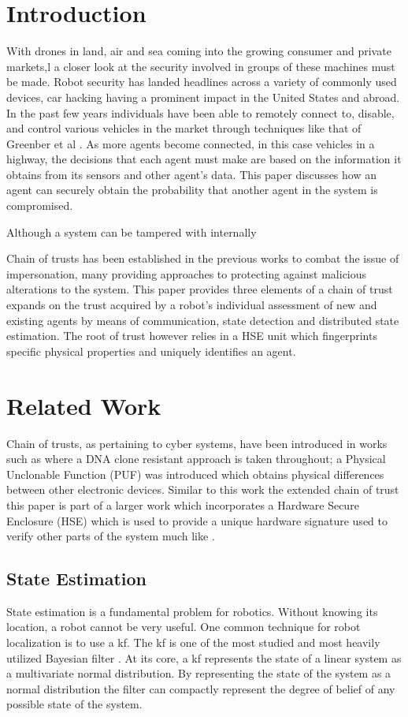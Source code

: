 \documentclass[conference]{IEEEtran}
\begin{document}
\section{Introduction}
With drones in land, air and sea coming into the growing consumer and private markets,l a closer look at the security involved in groups of these machines must be made. Robot security has landed headlines across a variety of commonly used devices, car hacking having a prominent impact in the United States and abroad. In the past few years individuals have been able to remotely connect to, disable, and control various vehicles in the market through techniques like that of Greenber et al \cite{greenberg2015hackers}. As more agents become connected, in this case vehicles in a highway, the decisions that each agent must make are based on the information it obtains from its sensors and other agent's data. This paper discusses how an agent can securely obtain the probability that another agent in the system is compromised.

Although a system can be tampered with internally 

Chain of trusts has been established in the previous works to combat the issue of impersonation, many providing approaches to protecting against malicious alterations to the system. This paper provides three elements of a chain of trust expands on the trust acquired by a robot's individual assessment of new and existing agents by means of communication, state detection and distributed state estimation. The root of trust however relies in a HSE unit which fingerprints specific physical properties and uniquely identifies an agent.

\section{Related Work}
Chain of trusts, as pertaining to cyber systems, have been introduced in works such as \cite{adi2009mechatronic} where a DNA clone resistant approach is taken throughout; a Physical Unclonable Function (PUF) was introduced which obtains physical differences between other electronic devices. Similar to this work the extended chain of trust this paper is part of a larger work which incorporates a Hardware Secure Enclosure (HSE) which is used to provide a unique hardware signature used to verify other parts of the system much like \cite{adi2009mechatronic}.

\subsection{State Estimation}
State estimation is a fundamental problem for robotics. Without knowing its location, a robot cannot be very useful. One common technique for robot localization is to use a \gls{kf}. The \gls{kf} is one of the most studied and most heavily utilized Bayesian filter \cite[39-81]{ProbabilisticRobotics}. At its core, a \gls{kf} represents the state of a linear system as a multivariate normal distribution. By representing the state of the system as a normal distribution the filter can compactly represent the degree of belief of any possible state of the system.
\end{document}
